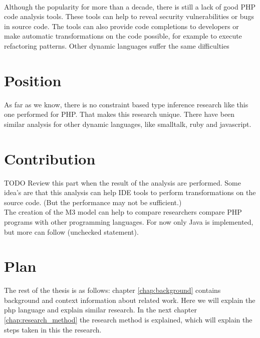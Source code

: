 \documentclass[../main.tex]{subfiles}
\begin{document}
        \paragraph{}%
        Although the popularity for more than a decade, there is still a lack of good PHP code analysis tools.
        These tools can help to reveal security vulnerabilities or bugs in source code.
        The tools can also provide code completions to developers or make automatic transformations on the code possible, for example to execute refactoring patterns.
        Other dynamic languages suffer the same difficulties
        
    \section{Position} %
        As far as we know, there is no constraint based type inference research like this one performed for PHP.
        That makes this research unique.
        There have been similar analysis for other dynamic languages, like smalltalk, ruby and javascript.
       
    \section{Contribution} %
        TODO Review this part when the result of the analysis are performed.
        Some idea's are that this analysis can help IDE tools to perform transformations on the source code.
        (But the performance may not be sufficient.)
        \\
        The creation of the M3 model can help to compare researchers compare PHP programs with other programming languages. For now only Java is implemented, but more can follow (unchecked statement).
    
    \section{Plan} %
        The rest of the thesis is as follows:
        chapter \ref{chap:background} contains background and context information about related work.
        Here we will explain the php language and explain similar research.
        In the next chapter \ref{chap:research_method} the research method is explained, which will explain the steps taken in this the research.
        
\end{document}
